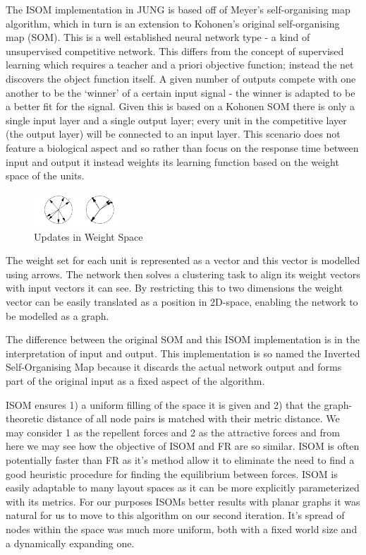 \documentclass[11pt, a4paper]{report}
\begin{document}
The ISOM implementation in JUNG is based off of Meyer’s self-organising map algorithm, which in turn is an extension to Kohonen’s original self-organising map (SOM). This is a well established neural network type - a kind of unsupervised competitive network. This differs from the concept of supervised learning which requires a teacher and a priori objective function; instead the net discovers the object function itself. A given number of outputs compete with one another to be the ‘winner’ of a certain input signal - the winner is adapted to be a better fit for the signal. Given this is based on a Kohonen SOM there is only a single input layer and a single output layer; every unit in the competitive layer (the output layer) will be connected to an input layer. This scenario does not feature a biological aspect and so rather than focus on the response time between input and output it instead weights its learning function based on the weight space of the units.

\begin{figure}[h]
        \centering
        \includegraphics[width=0.3\textwidth]{images/final/weight.png}
        \caption{Updates in Weight Space}
\end{figure}

The weight set for each unit is represented as a vector and this vector is modelled using arrows. The network then solves a clustering task to align its weight vectors with input vectors it can see. By restricting this to two dimensions the weight vector can be easily translated as a position in 2D-space, enabling the network to be modelled as a graph. 

The difference between the original SOM and this ISOM implementation is in the interpretation of input and output. This implementation is so named the Inverted Self-Organising Map because it discards the actual network output and forms part of the original input as a fixed aspect of the algorithm.

ISOM ensures 1) a uniform filling of the space it is given and 2) that the graph-theoretic distance of all node pairs is matched with their metric distance. We may consider 1 as the repellent forces and 2 as the attractive forces and from here we may see how the objective of ISOM and FR are so similar. ISOM is often potentially faster than FR as it’s method allow it to eliminate the need to find a good heuristic procedure for finding the equilibrium between forces. ISOM is easily adaptable to many layout spaces as it can be more explicitly parameterized with its metrics. For our purposes ISOMs better results with planar graphs it was natural for us to move to this algorithm on our second iteration. It’s spread of nodes within the space was much more uniform, both with a fixed world size and a dynamically expanding one.
\end{document}
